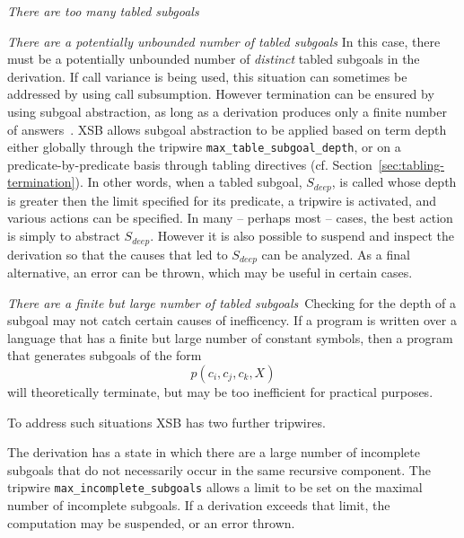\bi
\item {\em There are too many tabled subgoals} 
\bi
\item {\em There are a potentially unbounded number of tabled
  subgoals} In this case, there must be a potentially unbounded number
  of {\em distinct} tabled subgoals in the derivation.  If call
  variance is being used, this situation can sometimes be addressed by
  using call subsumption.  However termination can be ensured by using
  subgoal abstraction, as long as a derivation produces only a finite
  number of answers~\cite{RigS14}.  XSB allows subgoal abstraction to
  be applied based on term depth either globally through the tripwire
  {\tt max\_table\_subgoal\_depth}, or on a predicate-by-predicate
  basis through tabling directives
  (cf. Section~\ref{sec:tabling-termination}).  In other words, when a
  tabled subgoal, $S_{deep}$, is called whose depth is greater then
  the limit specified for its predicate, a tripwire is activated, and
  various actions can be specified.  In many -- perhaps most -- cases,
  the best action is simply to abstract $S_{deep}$.  However it is
  also possible to suspend and inspect the derivation so that the
  causes that led to $S_{deep}$ can be analyzed.  As a final
  alternative, an error can be thrown, which may be useful in certain
  cases.

\item {\em There are a finite but large number of tabled
  subgoals}\ Checking for the depth of a subgoal may not catch certain
  causes of inefficency. If a program is written over a language that
  has a finite but large number of constant symbols, then a program
  that generates subgoals of the form
\[
   p(c_i,c_j,c_k,X)
\]
  will theoretically terminate, but may be too inefficient for
  practical purposes.  

  To address such situations XSB has two further tripwires.
\bi
\item The derivation has a state in which there are a large number of
  incomplete subgoals that do not necessarily occur in the same
  recursive component.  The tripwire {\tt max\_incomplete\_subgoals}
  allows a limit to be set on the maximal number of incomplete
  subgoals.  If a derivation exceeds that limit, the computation may
  be suspended, or an error thrown.

